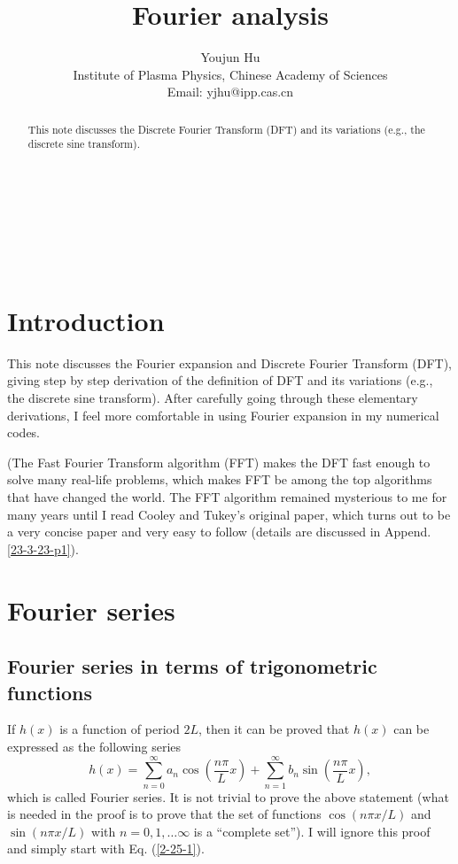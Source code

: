 \documentclass{article}
\newcommand{\tmaffiliation}[1]{\\ #1}
\begin{document}
\

\title{Fourier analysis}

\author{
  Youjun Hu
  \tmaffiliation{Institute of Plasma Physics, Chinese Academy of Sciences\\
  Email: yjhu@ipp.cas.cn}
}

\maketitle

\begin{abstract}
  This note discusses the Discrete Fourier Transform (DFT) and its variations
  (e.g., the discrete sine transform).
  
  \
  
  \ 
\end{abstract}

\section{Introduction}

This note discusses the Fourier expansion and Discrete Fourier Transform
(DFT), giving step by step derivation of the definition of DFT and its
variations (e.g., the discrete sine transform). After carefully going through
these elementary derivations, I feel more comfortable in using Fourier
expansion in my numerical codes.

(The Fast Fourier Transform algorithm (FFT) makes the DFT fast enough to solve
many real-life problems, which makes FFT be among the top algorithms that have
changed the world. The FFT algorithm remained mysterious to me for many years
until I read Cooley and Tukey's original paper, which turns out to be a very
concise paper and very easy to follow (details are discussed in Append.
\ref{23-3-23-p1}).

\section{Fourier series}

\subsection{Fourier series in terms of trigonometric functions}

If $h (x)$ is a function of period $2 L$, then it can be proved that $h (x)$
can be expressed as the following series
\begin{equation}
  \label{2-25-1} h (x) = \sum_{n = 0}^{\infty} a_n \cos \left( \frac{n \pi}{L}
  x \right) + \sum_{n = 1}^{\infty} b_n \sin \left( \frac{n \pi}{L} x \right),
\end{equation}
which is called Fourier series. It is not trivial to prove the above statement
(what is needed in the proof is to prove that the set of functions $\cos (n
\pi x / L)$ and $\sin (n \pi x / L)$ with $n = 0, 1, \ldots \infty$ is a
``complete set''{\cite{snieder1994}}). I will ignore this proof and simply
start with Eq. (\ref{2-25-1}).
\end{document}

